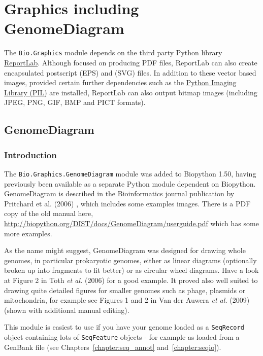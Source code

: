 \chapter{Graphics including GenomeDiagram}
\label{chapter:graphics}

The \verb|Bio.Graphics| module depends on the third party Python library
\href{https://www.reportlab.com/}{ReportLab}.  Although focused on producing PDF files,
ReportLab can also create encapsulated postscript (EPS) and (SVG) files.  In addition
to these vector based images, provided certain further dependencies such as the
\href{http://www.pythonware.com/products/pil/}{Python Imaging Library (PIL)} are
installed, ReportLab can also output bitmap images (including JPEG, PNG, GIF, BMP
and PICT formats).

\section{GenomeDiagram}
\label{sec:genomediagram}
\subsection{Introduction}

The \verb|Bio.Graphics.GenomeDiagram| module was added to Biopython 1.50,
having previously been available as a separate Python module dependent on Biopython.
GenomeDiagram is described in the Bioinformatics journal publication by Pritchard et al. (2006) \cite{pritchard2006},
which includes some examples images. There is a PDF copy of the old manual here,
\url{http://biopython.org/DIST/docs/GenomeDiagram/userguide.pdf} which has some
more examples.

As the name might suggest, GenomeDiagram was designed for drawing whole genomes, in
particular prokaryotic genomes, either as linear diagrams (optionally broken up into
fragments to fit better) or as circular wheel diagrams.  Have a look at Figure 2 in
Toth \textit{et al.} (2006) \cite{toth2006}
for a good example. It proved also well suited to drawing quite detailed figures for
smaller genomes such as phage, plasmids or mitochondria, for example see Figures 1
and 2 in Van der Auwera \textit{et al.} (2009) \cite{vanderauwera2009}
(shown with additional manual editing).

This module is easiest to use if you have your genome loaded as a \verb|SeqRecord|
object containing lots of \verb|SeqFeature| objects - for example as loaded from a
GenBank file (see Chapters~\ref{chapter:seq_annot} and~\ref{chapter:seqio}).

